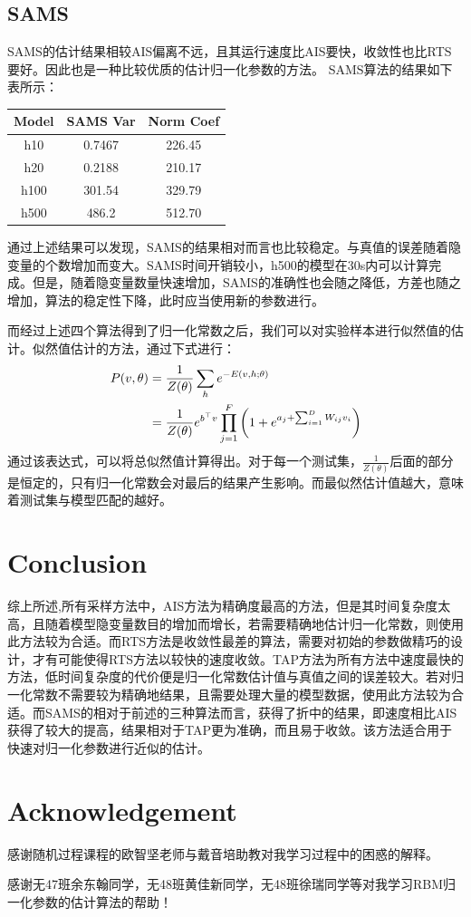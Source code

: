 \documentclass[journal,a4paper]{IEEEtran}
\begin{document}
	\subsection{SAMS}
		SAMS的估计结果相较AIS偏离不远，且其运行速度比AIS要快，收敛性也比RTS要好。因此也是一种比较优质的估计归一化参数的方法。
		SAMS算法的结果如下表所示：
		\begin{center}
		\begin{tabular}{c|cc}
			\hline
			Model & SAMS Var & Norm Coef\\
			\hline
			h10 & 0.7467 &   226.45 \\
			h20 & 0.2188 & 210.17 \\
			h100 & 301.54 & 329.79\\
			h500 & 486.2 & 512.70\\
			\hline
		\end{tabular}
	\end{center}
		通过上述结果可以发现，SAMS的结果相对而言也比较稳定。与真值的误差随着隐变量的个数增加而变大。SAMS时间开销较小，h500的模型在30s内可以计算完成。但是，随着隐变量数量快速增加，SAMS的准确性也会随之降低，方差也随之增加，算法的稳定性下降，此时应当使用新的参数进行。
		
		而经过上述四个算法得到了归一化常数之后，我们可以对实验样本进行似然值的估计。似然值估计的方法，通过下式进行：
		\begin{align}
		P(v,\theta) & = \frac{1}{Z(\theta)}\sum_h e^{-E(v,h;\theta)} \notag \\
		& = \frac{1}{Z(\theta)} e^{b^{\top}v} \prod_{j=1}^F \left(1+e^{a_j+\sum_{i=1}^{D}W_{ij}v_i}\right)
		\end{align}
		通过该表达式，可以将总似然值计算得出。对于每一个测试集，$\frac{1}{Z(\theta)}$后面的部分是恒定的，只有归一化常数会对最后的结果产生影响。而最似然估计值越大，意味着测试集与模型匹配的越好。
		
	\section{Conclusion}
		综上所述,所有采样方法中，AIS方法为精确度最高的方法，但是其时间复杂度太高，且随着模型隐变量数目的增加而增长，若需要精确地估计归一化常数，则使用此方法较为合适。而RTS方法是收敛性最差的算法，需要对初始的参数做精巧的设计，才有可能使得RTS方法以较快的速度收敛。TAP方法为所有方法中速度最快的方法，低时间复杂度的代价便是归一化常数估计值与真值之间的误差较大。若对归一化常数不需要较为精确地结果，且需要处理大量的模型数据，使用此方法较为合适。而SAMS的相对于前述的三种算法而言，获得了折中的结果，即速度相比AIS获得了较大的提高，结果相对于TAP更为准确，而且易于收敛。该方法适合用于快速对归一化参数进行近似的估计。
		
	\section{Acknowledgement}
	感谢随机过程课程的欧智坚老师与戴音培助教对我学习过程中的困惑的解释。

	感谢无47班余东翰同学，无48班黄佳新同学，无48班徐瑞同学等对我学习RBM归一化参数的估计算法的帮助！

	
\end{document}
